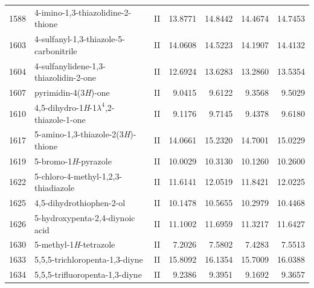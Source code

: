 \begin{longtable}{rlld{2.5}d{2.5}d{2.5}d{2.5}}
    1588 & 4-imino-1,3-thiazolidine-2-thione                      & II & 13.8771 & 14.8442 & 14.4674 & 14.7453 \\
    1603 & 4-sulfanyl-1,3-thiazole-5-carbonitrile                 & II & 14.0608 & 14.5223 & 14.1907 & 14.4132 \\
    1604 & 4-sulfanylidene-1,3-thiazolidin-2-one                  & II & 12.6924 & 13.6283 & 13.2860 & 13.5354 \\
    1607 & pyrimidin-4(3\textit{H})-one                           & II & 9.0415  & 9.6122  & 9.3568  & 9.5029  \\
    1610 & 4,5-dihydro-1\textit{H}-1$\lambda^4$,2-thiazole-1-one  & II & 9.1176  & 9.7145  & 9.4378  & 9.6180  \\
    1617 & 5-amino-1,3-thiazole-2(3\textit{H})-thione             & II & 14.0661 & 15.2320 & 14.7001 & 15.0229 \\
    1619 & 5-bromo-1\textit{H}-pyrazole                           & II & 10.0029 & 10.3130 & 10.1260 & 10.2600 \\
    1622 & 5-chloro-4-methyl-1,2,3-thiadiazole                    & II & 11.6141 & 12.0519 & 11.8421 & 12.0225 \\
    1625 & 4,5-dihydrothiophen-2-ol                               & II & 10.1478 & 10.5655 & 10.2979 & 10.4468 \\
    1626 & 5-hydroxypenta-2,4-diynoic   acid                      & II & 11.1002 & 11.6959 & 11.3217 & 11.6427 \\
    1630 & 5-methyl-1\textit{H}-tetrazole                         & II & 7.2026  & 7.5802  & 7.4283  & 7.5513  \\
    1633 & 5,5,5-trichloropenta-1,3-diyne                         & II & 15.8092 & 16.1354 & 15.7009 & 16.0388 \\
    1634 & 5,5,5-trifluoropenta-1,3-diyne                         & II & 9.2386  & 9.3951  & 9.1692  & 9.3657 
\end{longtable}

